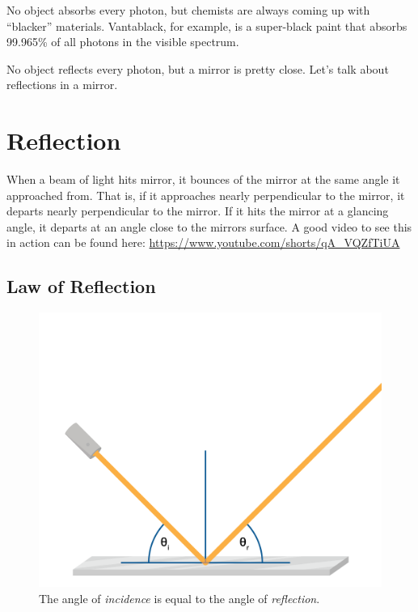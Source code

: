 No object absorbs every photon, but chemists are always coming up with
``blacker'' materials. Vantablack, for example, is a super-black paint
that absorbs 99.965\% of all photons in the visible spectrum.

No object reflects every photon, but a mirror is pretty close. Let's
talk about reflections in a mirror.

\section{Reflection}
When a beam of light hits mirror, it bounces of the mirror at the same
angle it approached from. That is, if it approaches nearly
perpendicular to the mirror, it departs nearly perpendicular to the
mirror. If it hits the mirror at a glancing angle, it departs at an
angle close to the mirrors surface. A good video to see this in action can be found here: \url{https://www.youtube.com/shorts/qA_VQZfTiUA}

\subsection{Law of Reflection}
\begin{figure}[htbp]
    \centering
    \includegraphics[width=1\textwidth]{reflection.png}
    \caption{The angle of \textit{incidence} is equal to the angle of \textit{reflection}.}
    \label{fig:lawOfReflectionImage}
\end{figure}


